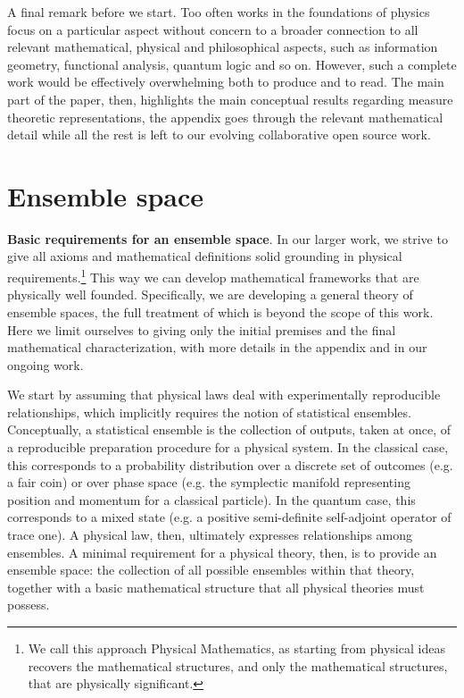 \documentclass[10pt,twocolumn, nofootinbib]{revtex4-2}
\begin{document}
A final remark before we start. Too often works in the foundations of physics focus on a particular aspect without concern to a broader connection to all relevant mathematical, physical and philosophical aspects, such as information geometry, functional analysis, quantum logic and so on. However, such a complete work would be effectively overwhelming both to produce and to read. The main part of the paper, then, highlights the main conceptual results regarding measure theoretic representations, the appendix goes through the relevant mathematical detail while all the rest is left to our evolving collaborative open source work.\cite{aop-book}

\section{Ensemble space}

\textbf{Basic requirements for an ensemble space}. In our larger work, we strive to give all axioms and mathematical definitions solid grounding in physical requirements.\footnote{We call this approach Physical Mathematics, as starting from physical ideas recovers the mathematical structures, and only the mathematical structures, that are physically significant.} This way we can develop mathematical frameworks that are physically well founded. Specifically, we are developing a general theory of ensemble spaces, the full treatment of which is beyond the scope of this work. Here we limit ourselves to giving only the initial premises and the final mathematical characterization, with more details in the appendix and in our ongoing work.\cite{aop-book}

We start by assuming that physical laws deal with experimentally reproducible relationships, which implicitly requires the notion of statistical ensembles. Conceptually, a statistical ensemble is the collection of outputs, taken at once, of a reproducible preparation procedure for a physical system. In the classical case, this corresponds to a probability distribution over a discrete set of outcomes (e.g. a fair coin) or over phase space (e.g. the symplectic manifold representing position and momentum for a classical particle). In the quantum case, this corresponds to a mixed state (e.g. a positive semi-definite self-adjoint operator of trace one). A physical law, then, ultimately expresses relationships among ensembles. A minimal requirement for a physical theory, then, is to provide an ensemble space: the collection of all possible ensembles within that theory, together with a basic mathematical structure that all physical theories must possess.
\end{document}
